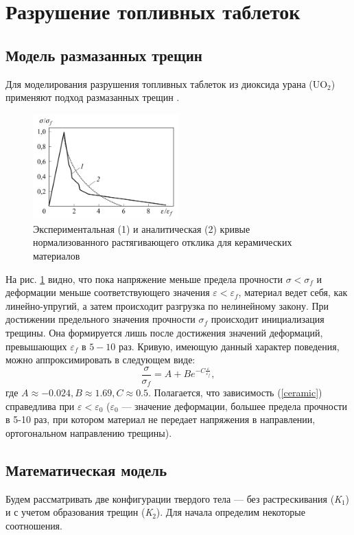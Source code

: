 \documentclass[12pt, a4paper]{article}
\begin{document}
\newpage
\section{Разрушение топливных таблеток}
\subsection{Модель размазанных трещин}
Для моделирования разрушения топливных таблеток из диоксида урана (UO$_2$) применяют подход размазанных трещин \cite{galanin1}.
\begin{figure}[H]
	\centering
	\includegraphics[width=0.5\textwidth]{ceramic}
	\caption{Экспериментальная (1) и аналитическая (2) кривые нормализованного растягивающего отклика для керамических материалов}
	\label{fig:ceramic}
\end{figure}
На рис. \ref{fig:ceramic} видно, что пока напряжение меньше предела прочности $\sigma < \sigma_f$  и деформации меньше соответствующего значения $\varepsilon < \varepsilon_f$, материал ведет себя, как линейно-упругий, а затем происходит разгрузка по нелинейному закону. При достижении предельного значения прочности $\sigma_f$ происходит инициализация трещины. Она формируется лишь после достижения значений деформаций, превышающих $\varepsilon_f$ в $5-10$ раз. Кривую, имеющую данный характер поведения, можно аппроксимировать в следующем виде:
\begin{equation}
\dfrac{\sigma}{\sigma_f} = A + B e^{-C\tfrac{\varepsilon}{\varepsilon_f}},
\label{ceramic}
\end{equation}
\noindent где $A \approx -0.024, B \approx 1.69, C \approx 0.5$. Полагается, что зависимость (\ref{ceramic}) справедлива при $\varepsilon<\varepsilon_0$ ($\varepsilon_0$ --- значение деформации, большее предела прочности в 5-10 раз, при котором материал не передает напряжения в направлении, ортогональном направлению трещины).
\subsection{Математическая модель}
Будем рассматривать две конфигурации твердого тела --- без растрескивания (\textit{K$_1$}) и с учетом образования трещин (\textit{K$_2$}). Для начала определим некоторые соотношения.
\end{document}

